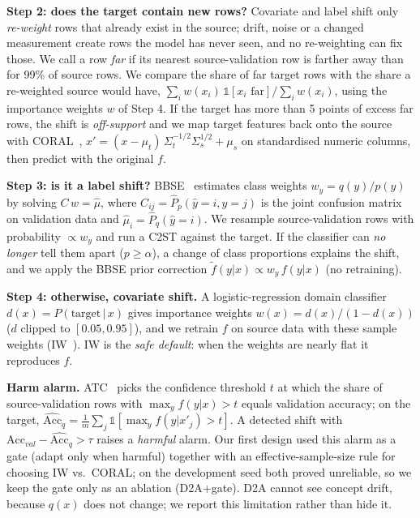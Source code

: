 \documentclass[conference]{IEEEtran}
\newcommand{\Dtwo}{\textsc{D2A}}
\begin{document}
\textbf{Step 2: does the target contain new rows?} Covariate and label shift only \emph{re-weight} rows that already exist in the source; drift, noise or a changed measurement create rows the model has never seen, and no re-weighting can fix those. We call a row \emph{far} if its nearest source-validation row is farther away than for 99\% of source rows. We compare the share of far target rows with the share a re-weighted source would have, $\sum_i w(x_i)\,\mathbb 1[x_i\text{ far}]/\sum_i w(x_i)$, using the importance weights $w$ of Step 4. If the target has more than 5 points of excess far rows, the shift is \emph{off-support} and we map target features back onto the source with CORAL~\cite{sun2016coral}, $x'=(x-\mu_t)\,\Sigma_t^{-1/2}\Sigma_s^{1/2}+\mu_s$ on standardised numeric columns, then predict with the original $f$.

\textbf{Step 3: is it a label shift?} BBSE~\cite{lipton2018bbse} estimates class weights $w_y=q(y)/p(y)$ by solving $C\,w=\hat\mu$, where $C_{ij}=\hat P_p(\hat y=i,y=j)$ is the joint confusion matrix on validation data and $\hat\mu_i=\hat P_q(\hat y=i)$. We resample source-validation rows with probability $\propto w_{y}$ and run a C2ST against the target. If the classifier can \emph{no longer} tell them apart ($p\ge\alpha$), a change of class proportions explains the shift, and we apply the BBSE prior correction $\tilde f(y|x)\propto w_y\,f(y|x)$ (no retraining).

\textbf{Step 4: otherwise, covariate shift.} A logistic-regression domain classifier $d(x)=P(\text{target}\,|\,x)$ gives importance weights $w(x)=d(x)/(1-d(x))$ ($d$ clipped to $[0.05,0.95]$), and we retrain $f$ on source data with these sample weights (IW~\cite{shimodaira2000}). IW is the \emph{safe default}: when the weights are nearly flat it reproduces $f$.

\textbf{Harm alarm.} ATC~\cite{garg2022atc} picks the confidence threshold $t$ at which the share of source-validation rows with $\max_y f(y|x)>t$ equals validation accuracy; on the target, $\widehat{\mathrm{Acc}}_q=\frac1m\sum_j\mathbb 1[\max_y f(y|x'_j)>t]$. A detected shift with $\mathrm{Acc}_{val}-\widehat{\mathrm{Acc}}_q>\tau$ raises a \emph{harmful} alarm. Our first design used this alarm as a gate (adapt only when harmful) together with an effective-sample-size rule for choosing IW vs.\ CORAL; on the development seed both proved unreliable, so we keep the gate only as an ablation (\Dtwo{}+gate). \Dtwo{} cannot see concept drift, because $q(x)$ does not change; we report this limitation rather than hide it.
\end{document}
